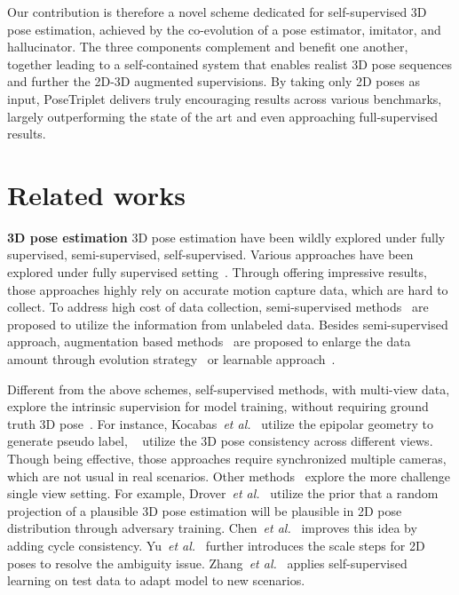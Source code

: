 \documentclass[10pt,twocolumn,letterpaper]{article}
\newcommand{\et}{\emph{et al.}}
\begin{document}
Our contribution is therefore a novel scheme
dedicated for self-supervised 3D pose estimation,
achieved by the co-evolution of a
pose estimator, imitator, and hallucinator. 
The three components complement and benefit one another, 
together leading
to a self-contained system
that enables realist 3D pose sequences
and further the 2D-3D augmented supervisions.
By taking only 2D poses as input,
PoseTriplet delivers
truly encouraging results across various benchmarks,
largely outperforming the state of the art 
and even approaching full-supervised results. 




 \section{Related works}

\noindent \textbf {3D pose estimation}
3D pose estimation have been wildly explored under fully supervised, semi-supervised, self-supervised.
Various approaches have been explored under fully supervised setting~\cite{martinez2017simple,mehta2017vnect,sun2018integral, nie2019spm,Yang2020Distill,pavllo2019videopose3d,kocabas2020vibe,Yang2021Pose,zhang2021bmp,wang2021mvp,WangJueICCV19}.
Through offering impressive results, those approaches highly rely on accurate motion capture data, which are hard to collect.
To address high cost of data collection, 
semi-supervised methods~\cite{zhou2017towards, li2019boosting, mitra2020multiview} are proposed to utilize the information from unlabeled data.  
Besides semi-supervised approach, augmentation based methods~\cite{Li_2020_CVPR, gong2021poseaug} are proposed to enlarge the data amount through evolution strategy~\cite{Li_2020_CVPR} or learnable approach~\cite{gong2021poseaug}.

Different from the above schemes,   self-supervised methods, with multi-view data,    explore the intrinsic supervision for model training, without requiring  ground truth 3D pose~\cite{kocabas2019epipolar, wandt2021canonpose,iqbal2020weakly }. 
For instance, Kocabas~\et~\cite{kocabas2019epipolar} utilize the epipolar geometry to generate pseudo label, ~\cite{wandt2021canonpose, iqbal2020weakly} utilize the 3D pose consistency across different views. Though being effective, those approaches require synchronized multiple cameras, which are not usual in real scenarios.
Other methods~\cite{drover2018can, chen2019unsupervised, yu2021towards, hu2021unsupervised} explore the more challenge single view setting.
For example, Drover~\et~\cite{drover2018can} utilize the prior that a random projection of a plausible 3D pose estimation will be plausible in 2D pose distribution through adversary training.
Chen~\et~\cite{chen2019unsupervised} improves this idea by adding cycle consistency. Yu~\et~\cite{yu2021towards} further introduces the scale steps for 2D poses to resolve the ambiguity issue.
Zhang~\et~\cite{zhang2020inference} applies self-supervised learning on test data to adapt model to new scenarios.
\end{document}
